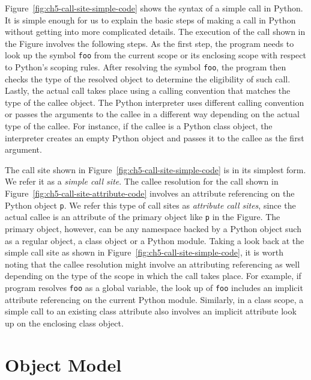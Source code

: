 Figure~\ref{fig:ch5-call-site-simple-code} shows the syntax of a simple call in Python.
It is simple enough for us to explain the basic steps of making a call in Python without getting into more complicated details.
The execution of the call shown in the Figure involves the following steps.
As the first step, the program needs to look up the symbol \texttt{foo} from the current scope or its enclosing scope with respect to Python's scoping rules.
After resolving the symbol \texttt{foo}, the program then checks the type of the resolved object to determine the eligibility of such call.
Lastly, the actual call takes place using a calling convention that matches the type of the callee object.
The Python interpreter uses different calling convention or passes the arguments to the callee in a different way depending on the actual type of the callee.
For instance, if the callee is a Python class object, the interpreter creates an empty Python object and passes it to the callee as the first argument.

The call site shown in Figure~\ref{fig:ch5-call-site-simple-code} is in its simplest form.
We refer it as a \emph{simple call site}.
The callee resolution for the call shown in Figure~\ref{fig:ch5-call-site-attribute-code} involves an attribute referencing on the Python object \texttt{p}.
We refer this type of call sites as \emph{attribute call sites}, since the actual callee is an attribute of the primary object like \texttt{p} in the Figure.
The primary object, however, can be any namespace backed by a Python object such as a regular object, a class object or a Python module.
Taking a look back at the simple call site as shown in Figure~\ref{fig:ch5-call-site-simple-code},
it is worth noting that the callee resolution might involve an attributing referencing as well depending on the type of the scope in which the call takes place.
For example, if program resolves \texttt{foo} as a global variable, the look up of \texttt{foo} includes an implicit attribute referencing on the current Python module.
Similarly, in a class scope, a simple call to an existing class attribute also involves an implicit attribute look up on the enclosing class object.

\section{Object Model}
